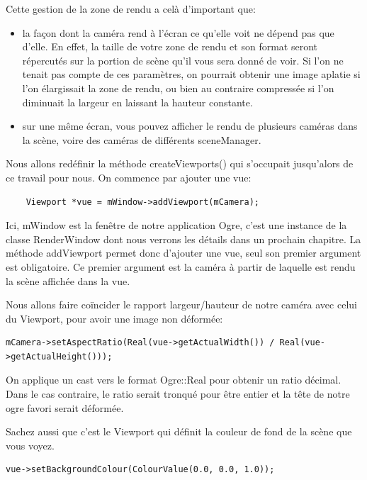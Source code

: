 Cette gestion de la zone de rendu a cel\`{a} d'important que:
\begin{itemize}
\item la fa\c{c}on dont la cam\'era rend \`{a} l'\'ecran ce qu'elle voit ne d\'epend pas que d'elle. En effet, la taille de votre zone de rendu et son format seront r\'epercut\'es sur la portion de sc\`ene qu'il vous sera donn\'e de voir. Si l'on ne tenait pas compte de ces param\`etres, on pourrait obtenir une image aplatie si l'on \'elargissait la zone de rendu, ou bien au contraire compress\'ee si l'on diminuait la largeur en laissant la hauteur constante.
\item sur une m\^eme \'ecran, vous pouvez afficher le rendu de plusieurs cam\'eras dans la sc\`ene, voire des cam\'eras de diff\'erents sceneManager.
\end{itemize}


Nous allons red\'efinir la m\'ethode createViewports() qui s'occupait jusqu'alors de ce travail pour nous. On commence par ajouter une vue:

\begin{lstlisting}
	Viewport *vue = mWindow->addViewport(mCamera);
\end{lstlisting}

Ici, mWindow est la fen\^etre de notre application Ogre, c'est une instance de la classe RenderWindow dont nous verrons les d\'etails dans un prochain chapitre. La m\'ethode addViewport permet donc d'ajouter une vue, seul son premier argument est obligatoire. Ce premier argument est la cam\'era \`a partir de laquelle est rendu la sc\`ene affich\'ee dans la vue.

Nous allons faire co\"incider le rapport largeur/hauteur de notre cam\'era avec celui du Viewport, pour avoir une image non d\'eform\'ee:
\begin{lstlisting}
mCamera->setAspectRatio(Real(vue->getActualWidth()) / Real(vue->getActualHeight()));
\end{lstlisting}

On applique un cast vers le format Ogre::Real pour obtenir un ratio d\'ecimal. Dans le cas contraire, le ratio serait tronqu\'e pour \^etre entier et la t\^ete de notre ogre favori serait d\'eform\'ee.

Sachez aussi que c'est le Viewport qui d\'efinit la couleur de fond de la sc\`ene que vous voyez. 
\begin{lstlisting}
vue->setBackgroundColour(ColourValue(0.0, 0.0, 1.0));
\end{lstlisting}

